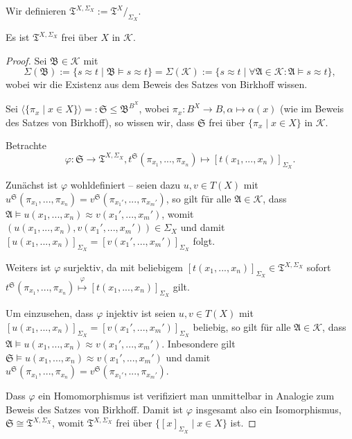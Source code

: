 \begin{definition}
    Wir definieren $ \mathfrak{T}^{X, \Sigma_X} := \mathfrak{T}^X /_{\Sigma_X}$.
\end{definition}

\begin{theorem}
    Es ist $\mathfrak{T}^{X, \Sigma_X}$ frei über $X$ in $\mathcal{K}$.
\end{theorem}

\begin{proof}
    Sei $\mathfrak{B} \in \mathcal{K}$ mit
    $$ \Sigma(\mathfrak{B}) := \{ s \approx t \mid \mathfrak{B} \models s \approx t \} = \Sigma(\mathcal{K}) := \{ s \approx t \mid \forall \mathfrak{A} \in \mathcal{K}: \mathfrak{A} \models s \approx t \}, $$
    wobei wir die Existenz aus dem Beweis des Satzes von Birkhoff wissen.
    
    Sei $\langle \{ \pi_x \mid x \in X \} \rangle =: \mathfrak{S} \leq \mathfrak{B}^{B^X}$, wobei $\pi_x : B^X \to B, \alpha \mapsto \alpha(x)$ (wie im Beweis des Satzes von Birkhoff), so wissen wir, dass $\mathfrak{S}$ frei über $\{ \pi_x \mid x \in X \}$ in $\mathcal{K}$.

    Betrachte
    $$ \varphi: \mathfrak{S} \to \mathfrak{T}^{X, \Sigma_X}, t^\mathfrak{S} (\pi_{x_1}, ..., \pi_{x_n}) \mapsto [t(x_1,...,x_n)]_{\Sigma_X}. $$

    Zunächst ist $\varphi$ wohldefiniert -- seien dazu $u, v \in T(X)$ mit $u^\mathfrak{S} (\pi_{x_1}, ..., \pi_{x_n}) = v^\mathfrak{S}(\pi_{x_1'}, ..., \pi_{x_m'})$, so gilt für alle $\mathfrak{A} \in \mathcal{K}$, dass $\mathfrak{A} \models u(x_1, ..., x_n) \approx v(x_1', ..., x_m')$, womit $(u(x_1, ..., x_n), v(x_1', ..., x_m')) \in \Sigma_X$ und damit $[u(x_1, ..., x_n)]_{\Sigma_X} = [v(x_1', ..., x_m')]_{\Sigma_X}$ folgt.

    Weiters ist $\varphi$ surjektiv, da mit beliebigem $[t(x_1,...,x_n)]_{\Sigma_X} \in \mathfrak{T}^{X, \Sigma_X}$ sofort \\ $t^\mathfrak{S}(\pi_{x_1}, ..., \pi_{x_n}) \overset{\varphi}{\mapsto} [t(x_1,...,x_n)]_{\Sigma_X}$ gilt.

    Um einzusehen, dass $\varphi$ injektiv ist seien $u, v \in T(X)$ mit $[u(x_1, ..., x_n)]_{\Sigma_X} = [v(x_1', ..., x_m')]_{\Sigma_X}$ beliebig, so gilt für alle $\mathfrak{A} \in \mathcal{K}$, dass $\mathfrak{A} \models u(x_1, ..., x_n) \approx v(x_1', ..., x_m')$. Inbesondere gilt $\mathfrak{S} \models u(x_1, ..., x_n) \approx v(x_1', ..., x_m')$ und damit $u^\mathfrak{S}(\pi_{x_1}, ..., \pi_{x_n}) = v^\mathfrak{S}(\pi_{x_1'}, ..., \pi_{x_m'})$.

    Dass $\varphi$ ein Homomorphismus ist verifiziert man unmittelbar in Analogie zum Beweis des Satzes von Birkhoff. Damit ist $\varphi$ insgesamt also ein Isomorphismus, $\mathfrak{S} \cong \mathfrak{T}^{X, \Sigma_X}$, womit $\mathfrak{T}^{X, \Sigma_X}$ frei über $\{ [x]_{\Sigma_X} \mid x \in X \}$ ist.
\end{proof}

